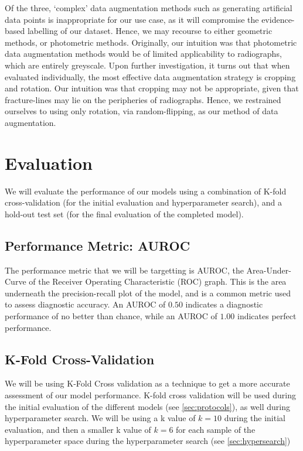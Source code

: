 \noindent
Of the three, \enquote*{complex} data augmentation methods such as generating artificial data points is inappropriate for our use case, as it will compromise the evidence-based labelling of our dataset. Hence, we may recourse to either geometric methods, or photometric methods. Originally, our intuition was that photometric data augmentation methods would be of limited applicability to radiographs, which are entirely greyscale. Upon further investigation, it turns out that when evaluated individually, the most effective data augmentation strategy is cropping and rotation. \autocite{benchmark} Our intuition was that cropping may not be appropriate, given that fracture-lines may lie on the peripheries of radiographs. Hence, we restrained ourselves to using only rotation, via random-flipping, as our method of data augmentation.

\section{Evaluation}

We will evaluate the performance of our models using a combination of K-fold cross-validation (for the initial evaluation and hyperparameter search), and a hold-out test set (for the final evaluation of the completed model).

\subsection{Performance Metric: AUROC}
The performance metric that we will be targetting is AUROC, the Area-Under-Curve of the Receiver Operating Characteristic (ROC) graph. This is the area underneath the precision-recall plot of the model, and is a common metric used to assess diagnostic accuracy. An AUROC of \(0.50\) indicates a diagnostic performance of no better than chance, while an AUROC of \(1.00\) indicates perfect performance.

\subsection{K-Fold Cross-Validation}
We will be using K-Fold Cross validation as a technique to get a more accurate assessment of our model performance. K-fold cross validation will be used during the initial evaluation of the different models (see \autoref{sec:protocols}), as well during hyperparameter search. We will be using a k value of \(k=10\) during the initial evaluation, and then a smaller k value of \(k=6\) for each sample of the hyperparameter space during the hyperparameter search (see \autoref{sec:hypersearch})

